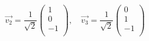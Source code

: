 \documentclass[12pt]{article}
\begin{document}
\[
    \vec{v_2} = \frac{1}{\sqrt{2}} \begin{pmatrix}
        1 \\
        0 \\
        -1 \\
    \end{pmatrix},\quad \vec{v_3} = \frac{1}{\sqrt{2}} \begin{pmatrix}
        0 \\
        1 \\
        -1 \\
    \end{pmatrix}
\]



\newpage


\nocite{El-Deeb_PEU-356_Assignments}
\end{document}
